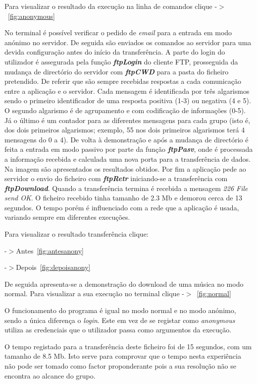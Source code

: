 \documentclass[a4paper]{article}
\begin{document}
Para visualizar o resultado da execução na linha de comandos clique -$>$~\autoref{fig:anonymous}

No terminal é possível verificar o pedido de \textit{email} para a entrada em modo anónimo no servidor. De seguida são enviados os comandos ao servidor para uma devida configuração antes do início da transferência. A parte do login do utilizador é assegurada pela função \textbf{\textit{ftpLogin}} do cliente FTP, prosseguida da mudança de directório do servidor com \textbf{\textit{ftpCWD}} para a pasta do ficheiro pretendido. De referir que são sempre recebidas respostas a cada comunicação entre a aplicação e o servidor. Cada mensagem é identificada por três algarismos sendo o primeiro identificador de uma resposta positiva (1-3) ou negativa (4 e 5). O segundo algarismo é de agrupamento e com codificação de informações (0-5). Já o último é um contador para as diferentes mensagens para cada grupo (isto é, dos dois primeiros algarismos; exemplo, 55 nos dois primeiros algarismos terá 4 mensagens do 0 a 4).
De volta à demonstração e após a mudança de directório é feita a entrada em modo passivo por parte da função \textbf{\textit{ftpPasv}}, onde é processada a informação recebida e calculada uma nova porta para a transferência de dados. Na imagem são apresentados os resultados obtidos. Por fim a aplicação pede ao servidor o envio do ficheiro com \textbf{\textit{ftpRetr}} iniciando-se a transferência com \textbf{\textit{ftpDownload}}. Quando a transferência termina é recebida a mensagem \textit{226 File send OK}. O ficheiro recebido tinha tamanho de 2.3 Mb e demorou cerca de 13 segundos. O tempo porém é influenciado com a rede que a aplicação é usada, variando sempre em diferentes execuções.

Para visualizar o resultado transferência clique:

-$>$Antes~\autoref{fig:antesanony}

-$>$Depois~\autoref{fig:depoisanony}

\pagebreak

De seguida apresenta-se a demonstração do download de uma música no modo normal.
Para visualizar a sua execução no terminal clique -$>$~\autoref{fig:normal}

O funcionamento do programa é igual no modo normal e no modo anónimo, sendo a única diferença o \textit{login}. Este em vez de se registar como \textit{anonymous} utiliza as credenciais que o utilizador passa como argumentos da execução.

O tempo registado para a transferência deste ficheiro foi de 15 segundos, com um tamanho de 8.5 Mb. Isto serve para comprovar que o tempo nesta experiência não pode ser tomado como factor proponderante pois a sua resolução não se encontra ao alcance do grupo.
\end{document}
